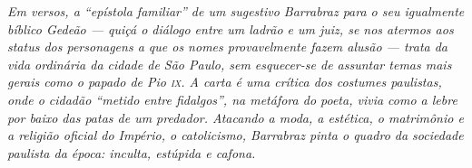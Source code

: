 \begin{didascalia}                                        
\emph{Em versos, a ``epístola familiar'' de um sugestivo Barrabraz para o
seu igualmente bíblico Gedeão --- quiçá o diálogo entre um ladrão e um
juiz, se nos atermos aos status dos personagens a que os nomes
provavelmente fazem alusão --- trata da vida ordinária da cidade de São
Paulo, sem esquecer-se de assuntar temas mais gerais como o papado de
Pio \textsc{ix}. A carta é uma crítica dos costumes paulistas, onde o cidadão
``metido entre fidalgos'', na metáfora do poeta, vivia como a lebre por
baixo das patas de um predador. Atacando a moda, a estética, o
matrimônio e a religião oficial do Império, o catolicismo, Barrabraz
pinta o quadro da sociedade paulista da época: inculta, estúpida e
cafona.}
\end{didascalia}




